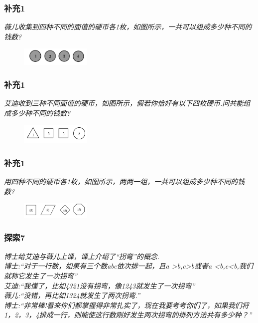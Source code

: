 \begin{frame}
    \frametitle{补充1}
    \textit{薇儿收集到四种不同的面值的硬币各1枚，如图所示，一共可以组成多少种不同的钱数?}
    \begin{figure}[H] 
        \centering
        \includegraphics[width=0.3\textwidth]{./pics/Chapter_2/buchong1_1.png}
    \end{figure}
\end{frame}

\begin{frame}
    \frametitle{补充1}
    \textit{艾迪收到三种不同面值的硬币，如图所示，假若你恰好有以下四枚硬币.问共能组成多少种不同的钱数?}
    \begin{figure}[H] 
        \centering
        \includegraphics[width=0.3\textwidth]{./pics/Chapter_2/buchong1_2.png}
    \end{figure}
\end{frame}


\begin{frame}
    \frametitle{补充1}
    \textit{用四种不同的硬币各1枚，如图所示，两两一组，一共可以组成多少种不同的钱数?}
    \begin{figure}[H] 
        \centering
        \includegraphics[width=0.3\textwidth]{./pics/Chapter_2/buchong1_3.png}
    \end{figure}
\end{frame}

\begin{frame}
    \frametitle{探索7}
    \textit{博士给艾迪与薇儿上课，课上介绍了``拐弯''的概念.\\
    博士:``对于一行数，如果有三个数abc依次排一起，且a >b,c>b或者a <b,c<b,我们就称它发生了一次拐弯''\\
    艾迪:``我懂了，比如4321没有拐弯，像1243就发生了一次拐弯''\\
    薇儿:``没错，再比如1324就发生了两次拐弯.''\\
    博士:``非常棒!看来你们都掌握得非常扎实了，现在我要考考你们了，如果我们将1，2，3，4排成一行，则能使这行数刚好发生两次拐弯的排列方法共有多少种？''}
\end{frame}

